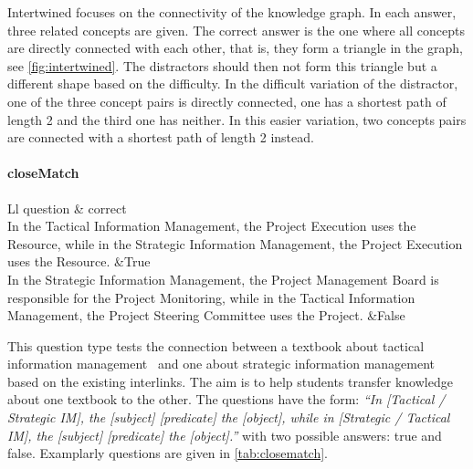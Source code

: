 \documentclass{IOS-Book-Article}     %
\begin{document}
\iffalse
Intertwined focuses on the connectivity of the knowledge graph.
In each answer, three related concepts are given.
The correct answer is the one where all concepts are directly connected with each other, that is, they form a triangle in the graph, see \cref{fig:intertwined}.
The distractors should then not form this triangle but a different shape based on the difficulty.
In the difficult variation of the distractor, one of the three concept pairs is directly connected, one has a shortest path of length 2 and the third one has neither.
In this easier variation, two concepts pairs are connected with a shortest path of length 2 instead.


\paragraph{closeMatch}
\begin{table}[h]
\begin{tabulary}{\textwidth}{Ll}
\toprule
question	& correct\\
\midrule
In the Tactical Information Management, the Project Execution uses the Resource, while in the Strategic Information Management, the Project Execution uses the Resource.											&True \\
In the Strategic Information Management, the Project Management Board is responsible for  the Project Monitoring, while in the Tactical Information Management, the Project Steering Committee uses the Project.	&False \\
\bottomrule
\end{tabulary}
\caption{Examples of generated \emph{closeMatch}-questions.}
\label{tab:closematch}
\end{table}

This question type tests the connection between a textbook about tactical information management~\cite{ob} and one about strategic information management~\cite{bb} based on the existing  interlinks.
The aim is to help students transfer knowledge about one textbook to the other.
The questions have the form: \emph{\enquote{In [Tactical / Strategic IM], the [subject] [predicate] the [object], while in [Strategic / Tactical IM], the [subject] [predicate] the [object].}} with two possible answers: true and false.
Examplarly questions are given in \cref{tab:closematch}.

\end{document}
